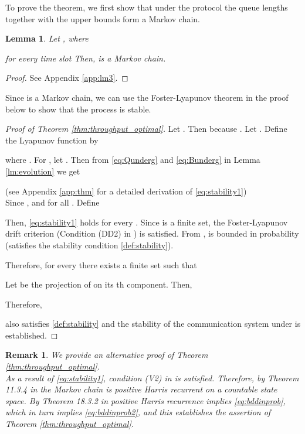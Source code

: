 \documentclass[onecolumn,draftcls]{IEEEtran}
\newtheorem{lemma}{Lemma}
\newtheorem{remark}{Remark}
\begin{document}
To prove the theorem, we first show that under the  protocol the queue lengths together with the upper bounds form a Markov chain.
\begin{lemma}
\label{lm:MC}
Let , where

for every time slot 
Then,  is a Markov chain.
\end{lemma}
\begin{proof}
See Appendix \ref{app:lm3}.
\end{proof}


Since  is a Markov chain, we can use the Foster-Lyapunov theorem in the proof below to show that the process  is stable.


\begin{proof}[Proof of Theorem \ref{thm:throughput_optimal}]
Let . Then  because .
Let .
Define the Lyapunov function  by

where .
For ,
let .
Then from \eqref{eq:Qunderg} and \eqref{eq:Bunderg} in Lemma \ref{lm:evolution} we get

(see Appendix \ref{app:thm} for a detailed derivation of \eqref{eq:stability1})
\\
Since ,  and  for all .
Define 

Then, \eqref{eq:stability1} holds for every .
Since  is a finite set, the Foster-Lyapunov drift criterion (Condition (DD2) in \cite{meyn1992stability}) is satisfied.
From \cite[Theorem 4.5]{meyn1992stability},  is bounded in probability (satisfies the stability condition \eqref{def:stability}).



Therefore, for every  there exists a finite set  such that

Let  be the projection of  on its th component.
Then,

Therefore,

also satisfies \eqref{def:stability} and the stability of the communication system under  is established.



\end{proof}
\begin{remark}
We provide an alternative proof of Theorem \ref{thm:throughput_optimal}.
\\
As a result of \eqref{eq:stability1}, condition (V2) in \cite[Chap. 11]{meyn2009markov} is satisfied.
Therefore, by Theorem 11.3.4 in \cite{meyn2009markov} the Markov chain  is positive Harris recurrent on a countable state space. By Theorem 18.3.2 in \cite{meyn2009markov} positive Harris recurrence implies \eqref{eq:bddinprob}, which in turn implies \eqref{eq:bddinprob2}, and this establishes the assertion of Theorem \ref{thm:throughput_optimal}.

\end{remark}
\end{document}
